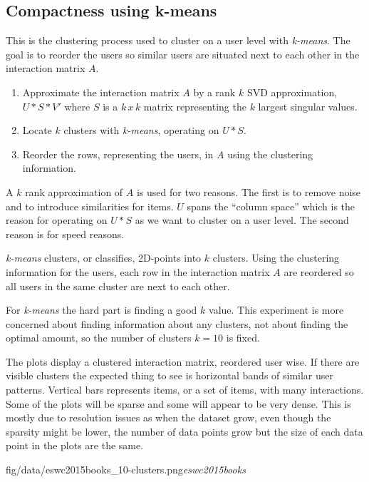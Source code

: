 
\subsection{Compactness using k-means}

This is the clustering process used to cluster on a user level with \textit{k-means}. The goal is to reorder the users so similar users are situated next to each other in the interaction matrix $A$.

\begin{enumerate}
    \item Approximate the interaction matrix $A$ by a rank $k$ SVD approximation, $U * S * V'$ where $S$ is a $k\,x\,k$ matrix representing the $k$ largest singular values.
    \item Locate $k$ clusters with \textit{k-means}, operating on $U * S$.
    \item Reorder the rows, representing the users, in $A$ using the clustering information.
\end{enumerate}

A $k$ rank approximation of $A$ is used for two reasons. The first is to remove noise and to introduce similarities for items. $U$ spans the ``column space'' which is the reason for operating on $U * S$ as we want to cluster on a user level. The second reason is for speed reasons.

\textit{k-means} clusters, or classifies, 2D-points into $k$ clusters. Using the clustering information for the users, each row in the interaction matrix $A$ are reordered so all users in the same cluster are next to each other.

For \textit{k-means} the hard part is finding a good $k$ value. This experiment is more concerned about finding information about any clusters, not about finding the optimal amount, so the number of clusters $k = 10$ is fixed.

The plots display a clustered interaction matrix, reordered user wise.
If there are visible clusters the expected thing to see is horizontal bands of similar user patterns. Vertical bars represents items, or a set of items, with many interactions.  Some of the plots will be sparse and some will appear to be very dense. This is mostly due to resolution issues as when the dataset grow, even though the sparsity might be lower, the number of data points grow but the size of each data point in the plots are the same.

\FloatBarrier

{fig/data/eswc2015books_10-clusters.png}{\textit{eswc2015books}}

